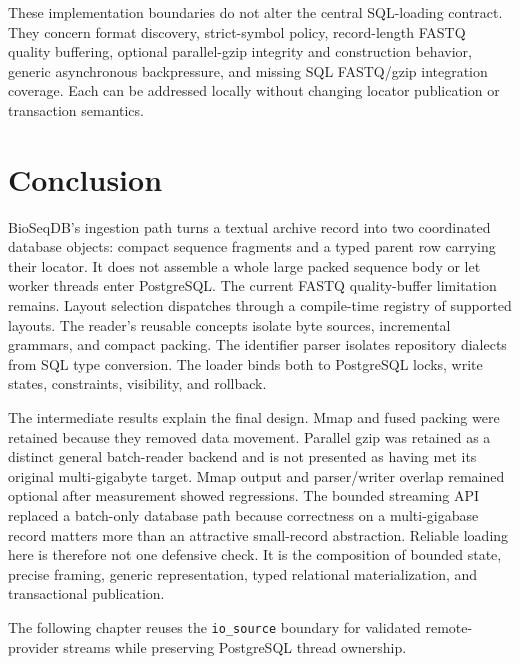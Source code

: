 These implementation boundaries do not alter the central
SQL-loading contract. They concern format discovery, strict-symbol policy,
record-length FASTQ quality buffering, optional parallel-gzip integrity and
construction behavior, generic asynchronous backpressure, and missing SQL
FASTQ/gzip integration coverage.
Each can be addressed locally without changing locator publication or
transaction semantics.

\section{Conclusion}

BioSeqDB's ingestion path turns a textual archive record into two coordinated
database objects: compact sequence fragments and a typed parent row carrying
their locator. It does not assemble a whole large packed sequence body or let
worker threads enter PostgreSQL. The current FASTQ quality-buffer limitation
remains. Layout selection dispatches through a compile-time registry of
supported layouts. The reader's reusable concepts
isolate byte sources, incremental grammars, and compact packing. The identifier
parser isolates repository dialects from SQL type conversion. The loader binds
both to PostgreSQL locks, write states, constraints, visibility, and rollback.

The intermediate results explain the final design. Mmap and fused packing
were retained because they removed data movement. Parallel gzip was retained
as a distinct general batch-reader backend and is not presented as having met
its original multi-gigabyte target. Mmap output and parser/writer overlap
remained optional after measurement showed regressions. The bounded streaming
API replaced a batch-only database path because correctness on a
multi-gigabase record matters more than an attractive small-record abstraction.
Reliable loading here is therefore not one defensive check. It is the
composition of bounded state, precise framing, generic representation, typed
relational materialization, and transactional publication.

The following chapter reuses the \texttt{io\_source} boundary for validated
remote-provider streams while preserving PostgreSQL thread ownership.
